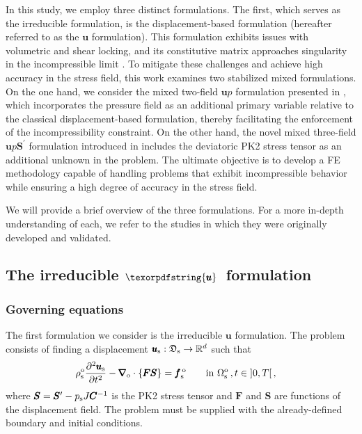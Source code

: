 \documentclass[11pt,english]{article}
\def\usolid{\pmb{u}_{\rm{s}}}                   %
\def\psolid{p_{\rm{s}}}                         %
\def\devPK{\pmb{S}^\prime}                      %
\def\u{{\pmb u}}                            %
\def\F{\pmb{F}}                             %
\def\PK{\pmb{S}}                            %
\def\invC{\pmb{C}^{-1}}                     %
\def\domainsolidreference{\Omega_{\rm{s}}^{\rm{o}}}  %
\def\bodyfsolid{\pmb{f}_{\rm{s}}^{\,\rm{o}}}        %
\def\grad{\pmb{\nabla}_{\rm{o}}}        %
\def\div{\grad \cdot}                   %
\def\denssolid{\rho_{\rm{s}}^{\rm{o}}}  %
\def\ups{\pmb{u} p \devPK}
\def\up{\pmb{u} p}
\def\timeint{\left ] 0,T\right[}                         %
\def\dudt{\frac{\partial \usolid}{\partial t}}          %
\def\dudt2{\frac{\partial^2 \usolid}{\partial t^2}}     %
\begin{document}
In this study, we employ three distinct formulations. The first, which serves as the irreducible formulation, is the displacement-based formulation (hereafter referred to as the $\pmb{u}$ formulation). This formulation exhibits issues with volumetric and shear locking, and its constitutive matrix approaches singularity in the incompressible limit \cite{CodinaCastanarBaiges2024}. To mitigate these challenges and achieve high accuracy in the stress field, this work examines two stabilized mixed formulations. On the one hand, we consider the mixed two-field \( \up \) formulation presented in \cite{Castanar2020}, which incorporates the pressure field as an additional primary variable relative to the classical displacement-based formulation, thereby facilitating the enforcement of the incompressibility constraint. On the other hand, the novel mixed three-field \( \ups \) formulation introduced in \cite{Castanar2023} includes the deviatoric PK2 stress tensor as an additional unknown in the problem. The ultimate objective is to develop a FE methodology capable of handling problems that exhibit incompressible behavior while ensuring a high degree of accuracy in the stress field.

We will provide a brief overview of the three formulations. For a more in-depth understanding of each, we refer to the studies in which they were originally developed and validated.

\subsection{The irreducible $\texorpdfstring{\u}~$ formulation\label{subsec:u_formulation}}

\subsubsection{Governing equations\label{subsubsec:u_formulation_governing}}
The first formulation we consider is the irreducible $\u$ formulation. The problem consists of finding a displacement $\usolid:\mathfrak{D}_{\mathrm{s}} \to \mathbb{R}^d$ such that
\begin{align}
    \denssolid \dudt2 - \div \lbrace \F \PK \rbrace &= \bodyfsolid \quad && \hbox{in}~\domainsolidreference\,, t \in \timeint, \label{eq:sol_conservation_linear_momentum_u} 
 \end{align}
where $\PK = \devPK - \psolid J \invC$ is the PK2 stress tensor and $\F$ and $\PK$ are functions of the displacement field. The problem must be supplied with the already-defined boundary and initial conditions.
\end{document}
